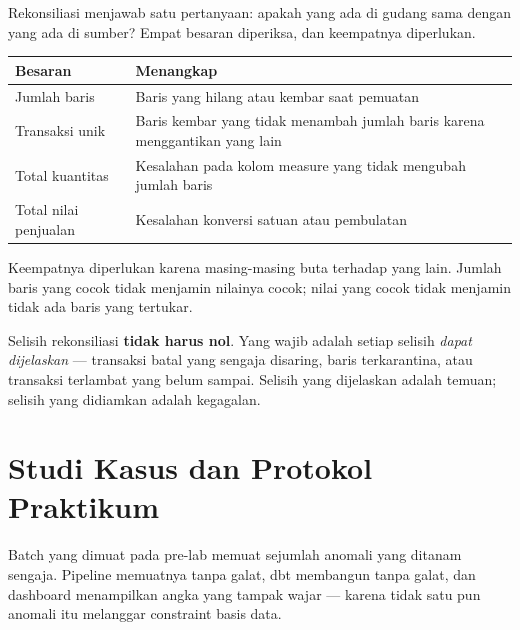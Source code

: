 Rekonsiliasi menjawab satu pertanyaan: apakah yang ada di gudang sama dengan
yang ada di sumber? Empat besaran diperiksa, dan keempatnya diperlukan.

\begin{center}
\small
\begin{tabular}{@{}p{}>{\raggedright\arraybackslash}p{}@{}}
\toprule
\textbf{Besaran} & \textbf{Menangkap} \\
\midrule
Jumlah baris & Baris yang hilang atau kembar saat pemuatan \\
Transaksi unik & Baris kembar yang tidak menambah jumlah baris karena
  menggantikan yang lain \\
Total kuantitas & Kesalahan pada kolom measure yang tidak mengubah jumlah
  baris \\
Total nilai penjualan & Kesalahan konversi satuan atau pembulatan \\
\bottomrule
\end{tabular}
\end{center}

Keempatnya diperlukan karena masing-masing buta terhadap yang lain. Jumlah baris
yang cocok tidak menjamin nilainya cocok; nilai yang cocok tidak menjamin tidak
ada baris yang tertukar.

\begin{peringatan}
Selisih rekonsiliasi \textbf{tidak harus nol}. Yang wajib adalah setiap selisih
\emph{dapat dijelaskan} --- transaksi batal yang sengaja disaring, baris
terkarantina, atau transaksi terlambat yang belum sampai. Selisih yang
dijelaskan adalah temuan; selisih yang didiamkan adalah kegagalan.
\end{peringatan}

\section{Studi Kasus dan Protokol Praktikum}

Batch yang dimuat pada pre-lab memuat sejumlah anomali yang ditanam sengaja.
Pipeline memuatnya tanpa galat, dbt membangun tanpa galat, dan dashboard
menampilkan angka yang tampak wajar --- karena tidak satu pun anomali itu
melanggar constraint basis data.

